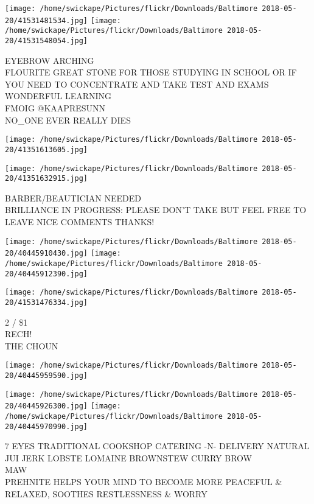 \documentclass[10pt,letterpaper]{article}
\begin{document}
\texttt{[image: /home/swickape/Pictures/flickr/Downloads/Baltimore 2018-05-20/41531481534.jpg]}
\texttt{[image: /home/swickape/Pictures/flickr/Downloads/Baltimore 2018-05-20/41531548054.jpg]}

EYEBROW ARCHING\\
FLOURITE GREAT STONE FOR THOSE STUDYING IN SCHOOL OR IF YOU NEED TO CONCENTRATE AND TAKE TEST AND EXAMS WONDERFUL LEARNING\\
FMOIG @KAAPRESUNN\\
NO\_ONE EVER  REALLY DIES
\pagebreak

\texttt{[image: /home/swickape/Pictures/flickr/Downloads/Baltimore 2018-05-20/41351613605.jpg]}

\vspace{0.25in}
\texttt{[image: /home/swickape/Pictures/flickr/Downloads/Baltimore 2018-05-20/41351632915.jpg]}

BARBER/BEAUTICIAN NEEDED\\
BRILLIANCE IN PROGRESS: PLEASE DON'T TAKE BUT FEEL FREE TO LEAVE NICE COMMENTS THANKS!
\pagebreak

\texttt{[image: /home/swickape/Pictures/flickr/Downloads/Baltimore 2018-05-20/40445910430.jpg]}
\texttt{[image: /home/swickape/Pictures/flickr/Downloads/Baltimore 2018-05-20/40445912390.jpg]}

\vspace{0.25in}
\texttt{[image: /home/swickape/Pictures/flickr/Downloads/Baltimore 2018-05-20/41531476334.jpg]}

2 / \$1\\
RECH!\\
THE CHOUN
\pagebreak

\texttt{[image: /home/swickape/Pictures/flickr/Downloads/Baltimore 2018-05-20/40445959590.jpg]}

\vspace{0.25in}
\texttt{[image: /home/swickape/Pictures/flickr/Downloads/Baltimore 2018-05-20/40445926300.jpg]}
\texttt{[image: /home/swickape/Pictures/flickr/Downloads/Baltimore 2018-05-20/40445970990.jpg]}

7 EYES TRADITIONAL COOKSHOP CATERING {-}N{-} DELIVERY NATURAL JUI JERK LOBSTE LOMAINE BROWNSTEW CURRY BROW\\
MAW\\
PREHNITE HELPS YOUR MIND TO BECOME MORE PEACEFUL \& RELAXED, SOOTHES RESTLESSNESS \& WORRY
\pagebreak
\end{document}
